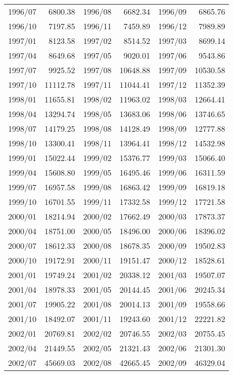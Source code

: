 \begin{center}
\begin{longtable}{rr|rr|rr}
    1996/07 & 6800.38 & 1996/08 & 6682.34 & 1996/09 & 6865.76 \\
    1996/10 & 7197.85 & 1996/11 & 7459.89 & 1996/12 & 7989.89 \\
    1997/01 & 8123.58 & 1997/02 & 8514.52 & 1997/03 & 8699.14 \\
    1997/04 & 8649.68 & 1997/05 & 9020.01 & 1997/06 & 9543.86 \\
    1997/07 & 9925.52 & 1997/08 & 10648.88 & 1997/09 & 10530.58 \\
    1997/10 & 11112.78 & 1997/11 & 11044.41 & 1997/12 & 11352.39 \\
    1998/01 & 11655.81 & 1998/02 & 11963.02 & 1998/03 & 12664.41 \\
    1998/04 & 13294.74 & 1998/05 & 13683.06 & 1998/06 & 13746.65 \\
    1998/07 & 14179.25 & 1998/08 & 14128.49 & 1998/09 & 12777.88 \\
    1998/10 & 13300.41 & 1998/11 & 13964.41 & 1998/12 & 14532.98 \\
    1999/01 & 15022.44 & 1999/02 & 15376.77 & 1999/03 & 15066.40 \\
    1999/04 & 15608.80 & 1999/05 & 16495.46 & 1999/06 & 16311.59 \\
    1999/07 & 16957.58 & 1999/08 & 16863.42 & 1999/09 & 16819.18 \\
    1999/10 & 16701.55 & 1999/11 & 17332.58 & 1999/12 & 17721.58 \\
    2000/01 & 18214.94 & 2000/02 & 17662.49 & 2000/03 & 17873.37 \\
    2000/04 & 18751.00 & 2000/05 & 18496.00 & 2000/06 & 18396.02 \\
    2000/07 & 18612.33 & 2000/08 & 18678.35 & 2000/09 & 19502.83 \\
    2000/10 & 19172.91 & 2000/11 & 19151.47 & 2000/12 & 18528.61 \\
    2001/01 & 19749.24 & 2001/02 & 20338.12 & 2001/03 & 19507.07 \\
    2001/04 & 18978.33 & 2001/05 & 20144.45 & 2001/06 & 20245.34 \\
    2001/07 & 19905.22 & 2001/08 & 20014.13 & 2001/09 & 19558.66 \\
    2001/10 & 18492.07 & 2001/11 & 19243.60 & 2001/12 & 22221.82 \\
    2002/01 & 20769.81 & 2002/02 & 20746.55 & 2002/03 & 20755.45 \\
    2002/04 & 21449.55 & 2002/05 & 21321.43 & 2002/06 & 21301.30 \\
    2002/07 & 45669.03 & 2002/08 & 42665.45 & 2002/09 & 46329.04 \\

\end{longtable}
\end{center}
